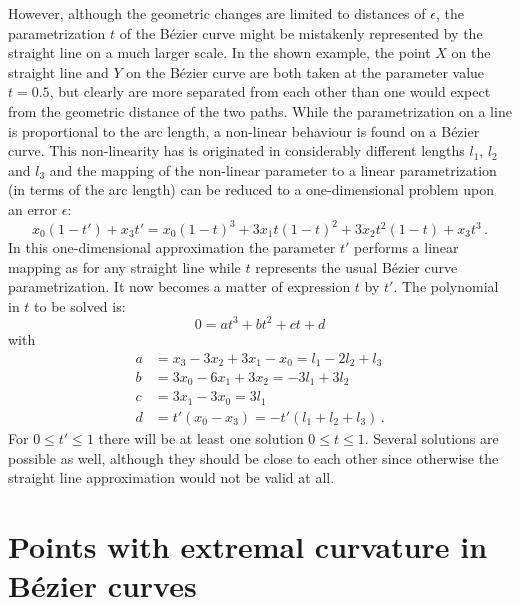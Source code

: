 \documentclass{article}
\begin{document}
However, although the geometric changes are limited to distances of
$\epsilon$, the parametrization $t$ of the B\'ezier curve might be
mistakenly represented by the straight line on a much larger scale.
In the shown example, the point $X$ on the straight line and $Y$ on
the B\'ezier curve are both taken at the parameter value $t=0.5$, but
clearly are more separated from each other than one would expect from
the geometric distance of the two paths. While the parametrization on
a line is proportional to the arc length, a non-linear behaviour is
found on a B\'ezier curve. This non-linearity has is originated in
considerably different lengths $l_1$, $l_2$ and $l_3$ and the mapping
of the non-linear parameter to a linear parametrization (in terms of
the arc length) can be reduced to a one-dimensional problem upon an
error $\epsilon$:
%
\begin{equation}
  x_0(1-t')+x_3t' = x_0(1-t)^3 + 3x_1t(1-t)^2 + 3x_2t^2(1-t) + x_3 t^3\,.
\end{equation}
%
In this one-dimensional approximation the parameter $t'$ performs a
linear mapping as for any straight line while $t$ represents the usual
B\'ezier curve parametrization. It now becomes a matter of expression
$t$ by $t'$. The polynomial in $t$ to be solved is:
%
\begin{equation}
  0 = at^3+bt^2+ct+d
\end{equation}
%
with
%
\begin{align}
  a & = x_3-3x_2+3x_1-x_0 = l_1-2l_2+l_3 \\
  b & = 3x_0-6x_1+3x_2 = -3l_1+3l_2 \\
  c & = 3x_1-3x_0 = 3l_1 \\
  d & = t'(x_0-x_3) = -t'(l_1+l_2+l_3)\,.
\end{align}
%
For $0\le t'\le1$ there will be at least one solution $0\le t\le1$.
Several solutions are possible as well, although they should be close
to each other since otherwise the straight line approximation would
not be valid at all.

\section{Points with extremal curvature in B\'ezier curves}
\end{document}

